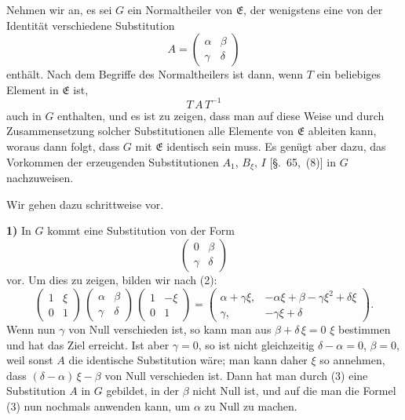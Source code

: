 \documentclass[12pt,a4paper]{article}
\begin{document}
Nehmen wir an, es sei $G$ ein Normaltheiler von $\mathfrak{E}$, der wenigstens eine von der Identität verschiedene Substitution
\begin{equation}\label{eq:66.1}
\tag{1}
A = \begin{pmatrix}\alpha&\beta\\\gamma&\delta\end{pmatrix}
\end{equation}
enthält. Nach dem Begriffe des Normaltheilers ist dann, wenn $T$ ein beliebiges Element in $\mathfrak{E}$ ist,
\begin{equation}\label{eq:66.2}
\tag{2}
T\,A\,T^{-1}
\end{equation}
auch in $G$ enthalten, und es ist zu zeigen, dass man auf diese Weise und durch Zusammensetzung solcher Substitutionen alle Elemente von $\mathfrak{E}$ ableiten kann, woraus dann folgt, dass $G$ mit $\mathfrak{E}$ identisch sein muss. Es genügt aber dazu, das Vorkommen der erzeugenden Substitutionen $A_{1}$, $B_{\xi}$, $I$ [\S.~65,~(8)] in $G$ nachzuweisen.

Wir gehen dazu schrittweise vor.

\medskip\noindent
\textbf{1)} In $G$ kommt eine Substitution von der Form
\[
\begin{pmatrix}0&\beta\\\gamma&\delta\end{pmatrix}
\]
vor. Um dies zu zeigen, bilden wir nach (2):
\begin{equation}\label{eq:66.3}
\tag{3}
\begin{pmatrix}1&\xi\\0&1\end{pmatrix}\,
\begin{pmatrix}\alpha&\beta\\\gamma&\delta\end{pmatrix}\,
\begin{pmatrix}1&-\xi\\0&1\end{pmatrix}
=
\begin{pmatrix}
\alpha + \gamma\xi,& -\alpha\xi + \beta - \gamma\xi^{2} + \delta\xi\\
\gamma,& -\gamma\xi + \delta
\end{pmatrix}.
\end{equation}
Wenn nun $\gamma$ von Null verschieden ist, so kann man aus $\beta + \delta\,\xi = 0$ $\xi$ bestimmen und hat das Ziel erreicht. Ist aber $\gamma = 0$, so ist nicht gleichzeitig $\delta - \alpha = 0$, $\beta = 0$, weil sonst $A$ die identische Substitution wäre; man kann daher $\xi$ so annehmen, dass $(\delta - \alpha)\,\xi - \beta$ von Null verschieden ist. Dann hat man durch (3) eine Substitution $A$ in $G$ gebildet, in der $\beta$ nicht Null ist, und auf die man die Formel (3) nun nochmals anwenden kann, um $\alpha$ zu Null zu machen.
\end{document}
